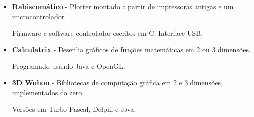 \documentclass[a4paper,10pt]{article}
\begin{document}
\begin{itemize}
      \item 
        \textbf{Rabiscomático} - Plotter montado a partir de impressoras antigas e um microcontrolador.

        Firmware e software controlador escritos em C. Interface USB.

      \item 
        \textbf{Calculatrix} - Desenha gráficos de funções matemáticas em 2 ou 3 dimensões.

        Programado usando Java e OpenGL.

      \item 
        \textbf{3D Wohoo} - Bibliotecas de computação gráfica em 2 e 3 dimensões, implementados do zero.

        Versões em Turbo Pascal, Delphi e Java.
    \end{itemize}
\end{document}
